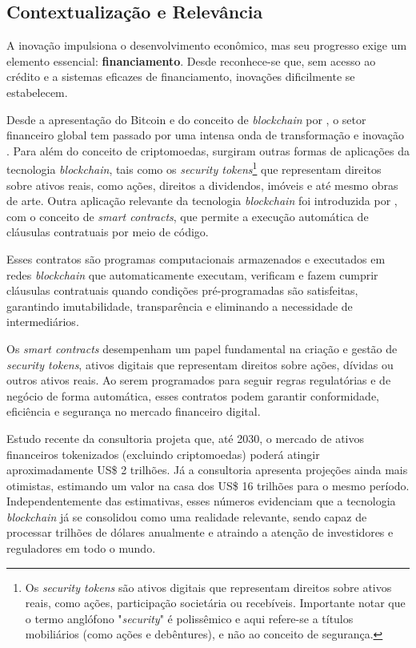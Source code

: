 \documentclass[12pt, a4paper, oneside, openright, chapter=TITLE]{abntex2}
\begin{document}
\subsection{Contextualização e Relevância}
\hspace*{\parindent} A inovação impulsiona o desenvolvimento econômico, mas seu progresso exige um elemento essencial: \textbf{financiamento}. Desde  reconhece-se que, sem acesso ao crédito e a sistemas eficazes de financiamento, inovações dificilmente se estabelecem.

Desde a apresentação do Bitcoin e do conceito de \textit{blockchain} por , o setor financeiro global tem passado por uma intensa onda de transformação e inovação \cite{kondova2019}. Para além do conceito de criptomoedas, surgiram outras formas de aplicações da tecnologia \textit{blockchain}, tais como os \textit{security tokens}\footnote{Os \textit{security tokens} são ativos digitais que representam direitos sobre ativos reais, como ações, participação societária ou recebíveis. Importante notar que o termo anglófono "\textit{security}" é polissêmico e aqui refere-se a títulos mobiliários (como ações e debêntures), e não ao conceito de segurança.} que representam direitos sobre ativos reais, como ações, direitos a dividendos, imóveis e até mesmo obras de arte. Outra aplicação relevante da tecnologia \textit{blockchain} foi introduzida por , com o conceito de \textit{smart contracts}, que permite a execução automática de cláusulas contratuais por meio de código.

Esses contratos são programas computacionais armazenados e executados em redes \textit{blockchain} que automaticamente executam, verificam e fazem cumprir cláusulas contratuais quando condições pré-programadas são satisfeitas, garantindo imutabilidade, transparência e eliminando a necessidade de intermediários.

Os \textit{smart contracts} desempenham um papel fundamental na criação e gestão de \textit{security tokens}, ativos digitais que representam direitos sobre ações, dívidas ou outros ativos reais. Ao serem programados para seguir regras regulatórias e de negócio de forma automática, esses contratos podem garantir conformidade, eficiência e segurança no mercado financeiro digital.

Estudo recente da consultoria  projeta que, até 2030, o mercado de ativos financeiros tokenizados (excluindo criptomoedas) poderá atingir aproximadamente US\$ 2 trilhões. Já a consultoria  apresenta projeções ainda mais otimistas, estimando um valor na casa dos US\$ 16 trilhões para o mesmo período. Independentemente das estimativas, esses números evidenciam que a tecnologia \textit{blockchain} já se consolidou como uma realidade relevante, sendo capaz de processar trilhões de dólares anualmente e atraindo a atenção de investidores e reguladores em todo o mundo.
\end{document}
